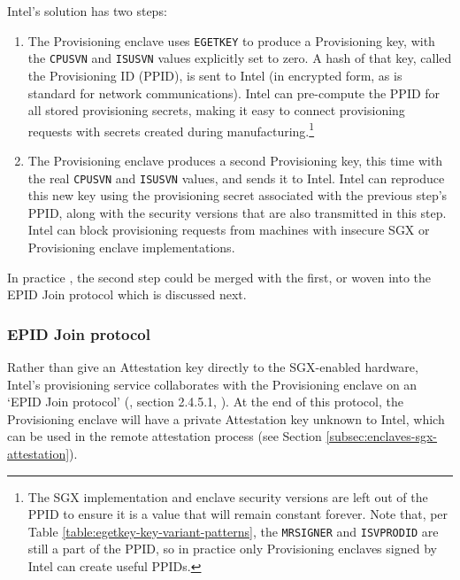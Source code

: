 Intel's solution has two steps:
\begin{enumerate}
    \item The Provisioning enclave uses {\tt EGETKEY} to produce a Provisioning key, with the {\tt CPUSVN} and {\tt ISUSVN} values explicitly set to zero. A hash of that key, called the Provisioning ID (PPID), is sent to Intel (in encrypted form, as is standard for network communications). Intel can pre-compute the PPID for all stored provisioning secrets, making it easy to connect provisioning requests with secrets created during manufacturing.\footnote{The SGX implementation and enclave security versions are left out of the PPID to ensure it is a value that will remain constant forever. Note that, per Table \ref{table:egetkey-key-variant-patterns}, the {\tt MRSIGNER} and {\tt ISVPRODID} are still a part of the PPID, so in practice only Provisioning enclaves signed by Intel can create useful PPIDs.}
    \item The Provisioning enclave produces a second Provisioning key, this time with the real {\tt CPUSVN} and {\tt ISUSVN} values, and sends it to Intel. Intel can reproduce this new key using the provisioning secret associated with the previous step's PPID, along with the security versions that are also transmitted in this step. Intel can block provisioning requests from machines with insecure SGX or Provisioning enclave implementations.
\end{enumerate}

In practice \cite{sgx-remote-attestation-is-not-sufficient}, the second step could be merged with the first, or woven into the EPID Join protocol which is discussed next.

\subsubsection{EPID Join protocol}

Rather than give an Attestation key directly to the SGX-enabled hardware, Intel's provisioning service collaborates with the Provisioning enclave on an `EPID Join protocol' (\cite{epid-paper}, \cite{sgx-extending-sgx-autonomy-and-anonymity-thesis} section 2.4.5.1, \cite{sgx-remote-attestation-is-not-sufficient}). At the end of this protocol, the Provisioning enclave will have a private Attestation key unknown to Intel, which can be used in the remote attestation process (see Section \ref{subsec:enclaves-sgx-attestation}).

